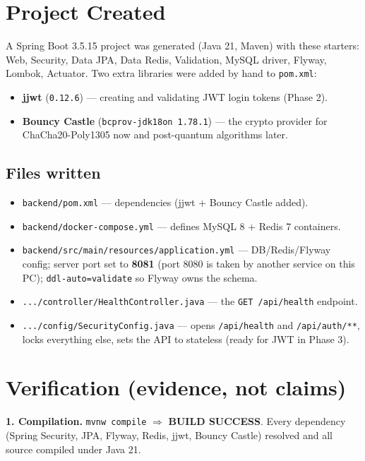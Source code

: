 \documentclass[11pt,a4paper]{article}
\newcommand{\code}[1]{\texttt{#1}}
\begin{document}
\section{Project Created}
A Spring Boot 3.5.15 project was generated (Java 21, Maven) with these starters:
Web, Security, Data JPA, Data Redis, Validation, MySQL driver, Flyway, Lombok, Actuator.
Two extra libraries were added by hand to \code{pom.xml}:
\begin{itemize}[leftmargin=*]
  \item \textbf{jjwt} (\code{0.12.6}) --- creating and validating JWT login tokens (Phase 2).
  \item \textbf{Bouncy Castle} (\code{bcprov-jdk18on 1.78.1}) --- the crypto provider for
        ChaCha20-Poly1305 now and post-quantum algorithms later.
\end{itemize}

\subsection*{Files written}
\begin{itemize}[leftmargin=*]
  \item \code{backend/pom.xml} --- dependencies (jjwt + Bouncy Castle added).
  \item \code{backend/docker-compose.yml} --- defines MySQL 8 + Redis 7 containers.
  \item \code{backend/src/main/resources/application.yml} --- DB/Redis/Flyway config; server port
        set to \textbf{8081} (port 8080 is taken by another service on this PC);
        \code{ddl-auto=validate} so Flyway owns the schema.
  \item \code{.../controller/HealthController.java} --- the \code{GET /api/health} endpoint.
  \item \code{.../config/SecurityConfig.java} --- opens \code{/api/health} and \code{/api/auth/**},
        locks everything else, sets the API to stateless (ready for JWT in Phase 3).
\end{itemize}

\section{Verification (evidence, not claims)}
\begin{done}
\textbf{1. Compilation.} \code{mvnw compile} $\Rightarrow$ \textbf{BUILD SUCCESS}. Every dependency
(Spring Security, JPA, Flyway, Redis, jjwt, Bouncy Castle) resolved and all source compiled under
Java 21.
\end{done}
\end{document}
